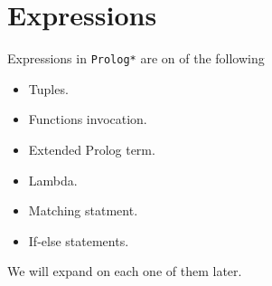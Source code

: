 \section{Expressions}

Expressions in \texttt{Prolog*} are on of the following
\begin{itemize}
    \item Tuples.
    \item Functions invocation.
    \item Extended Prolog term. 
    \item Lambda.
    \item Matching statment.
    \item If-else statements.
\end{itemize}

We will expand on each one of them later.
